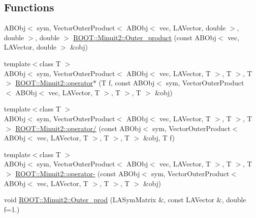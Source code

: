 \subsection*{Functions}
\begin{DoxyCompactItemize}
\item 
A\+B\+Obj$<$ sym, Vector\+Outer\+Product$<$ A\+B\+Obj$<$ vec, L\+A\+Vector, double $>$, double $>$, double $>$ \mbox{\hyperlink{namespaceROOT_1_1Minuit2_a2f3a76ab9b1a9a2ed58cfdc8de6ff704}{R\+O\+O\+T\+::\+Minuit2\+::\+Outer\+\_\+product}} (const A\+B\+Obj$<$ vec, L\+A\+Vector, double $>$ \&obj)
\item 
{\footnotesize template$<$class T $>$ }\\A\+B\+Obj$<$ sym, Vector\+Outer\+Product$<$ A\+B\+Obj$<$ vec, L\+A\+Vector, T $>$, T $>$, T $>$ \mbox{\hyperlink{namespaceROOT_1_1Minuit2_acfa392f20b9648705bf3750c7f0c842e}{R\+O\+O\+T\+::\+Minuit2\+::operator$\ast$}} (T f, const A\+B\+Obj$<$ sym, Vector\+Outer\+Product$<$ A\+B\+Obj$<$ vec, L\+A\+Vector, T $>$, T $>$, T $>$ \&obj)
\item 
{\footnotesize template$<$class T $>$ }\\A\+B\+Obj$<$ sym, Vector\+Outer\+Product$<$ A\+B\+Obj$<$ vec, L\+A\+Vector, T $>$, T $>$, T $>$ \mbox{\hyperlink{namespaceROOT_1_1Minuit2_aa961ad5b61bfb20977d423945ad1a8f9}{R\+O\+O\+T\+::\+Minuit2\+::operator/}} (const A\+B\+Obj$<$ sym, Vector\+Outer\+Product$<$ A\+B\+Obj$<$ vec, L\+A\+Vector, T $>$, T $>$, T $>$ \&obj, T f)
\item 
{\footnotesize template$<$class T $>$ }\\A\+B\+Obj$<$ sym, Vector\+Outer\+Product$<$ A\+B\+Obj$<$ vec, L\+A\+Vector, T $>$, T $>$, T $>$ \mbox{\hyperlink{namespaceROOT_1_1Minuit2_acef6728c8c24759479f97a32d56544f1}{R\+O\+O\+T\+::\+Minuit2\+::operator-\/}} (const A\+B\+Obj$<$ sym, Vector\+Outer\+Product$<$ A\+B\+Obj$<$ vec, L\+A\+Vector, T $>$, T $>$, T $>$ \&obj)
\item 
void \mbox{\hyperlink{namespaceROOT_1_1Minuit2_ac07a37ec0cf04b47c95ddc6943487ef2}{R\+O\+O\+T\+::\+Minuit2\+::\+Outer\+\_\+prod}} (L\+A\+Sym\+Matrix \&, const L\+A\+Vector \&, double f=1.)
\end{DoxyCompactItemize}
